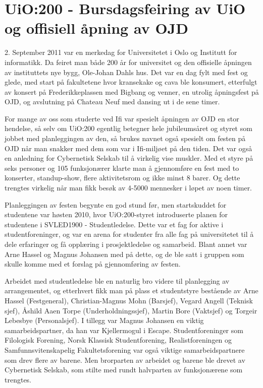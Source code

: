\chapter[UiO:200]{UiO:200 - Bursdagsfeiring av UiO og offisiell åpning av OJD}

\author{Skrevet av Arne Hassel}

2. September 2011 var en merkedag for Universitetet i Oslo og Institutt for informatikk. Da feiret man både 200 år for universitet og den offisielle åpningen av instituttets nye bygg, Ole-Johan Dahls hus. Det var en dag fylt med fest og glede, med start på fakultetene hvor kransekake og cava ble konsumert, etterfulgt av konsert på Frederikkeplassen med Bigbang og venner, en utrolig åpningsfest på OJD, og avslutning på Chateau Neuf med dansing ut i de sene timer.

For mange av oss som studerte ved Ifi var spesielt åpningen av OJD en stor hendelse, så selv om UiO:200 egentlig betegner hele jubileumsåret og styret som jobbet med planleggingen av den, så brukes navnet også spesielt om festen på OJD når man snakker med dem som var i Ifi-miljøet på den tiden. Det var også en anledning for Cybernetisk Selskab til å virkelig vise muskler. Med et styre på seks personer og 105 funksjonærer klarte man å gjennomføre en fest med to konserter, standup-show, flere aktivitetsrom og ikke minst 8 barer. Og dette trengtes virkelig når man fikk besøk av 4-5000 mennesker i løpet av noen timer.

Planleggingen av festen begynte en god stund før, men startskuddet for studentene var høsten 2010, hvor UiO:200-styret introduserte planen for studentene i SVLED1900 - Studentledelse. Dette var et fag for aktive i studentforeninger, og var en arena for studenter fra alle fag på universitetet til å dele erfaringer og få opplæring i prosjektledelse og samarbeid. Blant annet var Arne Hassel og Magnus Johansen med på dette, og de ble satt i gruppen som skulle komme med et forslag på gjennomføring av festen.

Arbeidet med studentledelse ble en naturlig bro videre til planlegging av arrangementet, og etterhvert fikk man på plass et studentstyre bestående av Arne Hassel (Festgeneral), Christian-Magnus Mohn (Barsjef), Vegard Angell (Teknisk sjef), Åshild Aaen Torpe (Underholdningssjef), Martin Bore (Vaktsjef) og Torgeir Lebesbye (Personalsjef). I tillegg var Magnus Johansen en viktig samarbeidspartner, da han var Kjellermogul i Escape. Studentforeninger som Filologisk Forening, Norsk Klassisk Studentforening, Realistforeningen og Samfunnsvitenskapelig Fakultetsforening var også viktige samarbeidspartnere som drev flere av barene. Men brorparten av arbeidet og barene ble drevet av Cybernetisk Selskab, som stilte med rundt halvparten av funksjonærene som trengtes.

